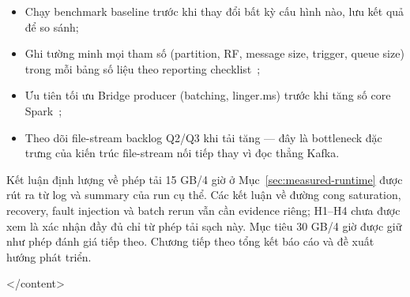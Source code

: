 \begin{itemize}
  \item Chạy benchmark baseline trước khi thay đổi bất kỳ cấu hình nào,
        lưu kết quả để so sánh;
  \item Ghi tường minh mọi tham số (partition, RF, message size, trigger,
        queue size) trong mỗi bảng số liệu theo reporting
        checklist~\cite{kafka_patterns_benchmark_2025};
  \item Ưu tiên tối ưu Bridge producer (batching, linger.ms) trước khi tăng
        số core Spark~\cite{confluent_optimize_clients};
  \item Theo dõi file-stream backlog Q2/Q3 khi tải tăng --- đây là bottleneck
        đặc trưng của kiến trúc file-stream nối tiếp thay vì đọc thẳng Kafka.
\end{itemize}

Kết luận định lượng về phép tải 15 GB/4 giờ ở Mục~\ref{sec:measured-runtime}
được rút ra từ log và summary của run cụ thể. Các kết luận về đường cong
saturation, recovery, fault injection và batch rerun vẫn cần evidence riêng;
H1--H4 chưa được xem là xác nhận đầy đủ chỉ từ phép tải sạch này. Mục tiêu
30 GB/4 giờ được giữ như phép đánh giá tiếp theo. Chương tiếp theo tổng kết
báo cáo và đề xuất hướng phát triển.

</content>
